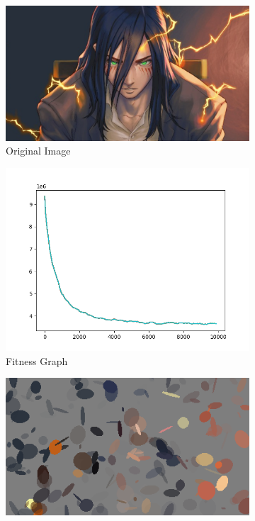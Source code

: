 \documentclass[10pt, conference]{IEEEtran}
\begin{document}
\begin{figure}[h]
    \centering
    \begin{subfigure}{0.4\linewidth}
        \centering
        \includegraphics[width=\linewidth]{eren orig.png}
        \caption{Original Image}
    \end{subfigure}%
    \hfill
    \begin{subfigure}{0.4\linewidth}
        \centering
        \includegraphics[width=\linewidth]{fitness_generation_9900.png}
        \caption{Fitness Graph}
    \end{subfigure}
    \begin{subfigure}{0.4\linewidth}
        \centering
        \includegraphics[width=\linewidth]{generated_100.png}

\end{subfigure}
\end{figure}
\end{document}

